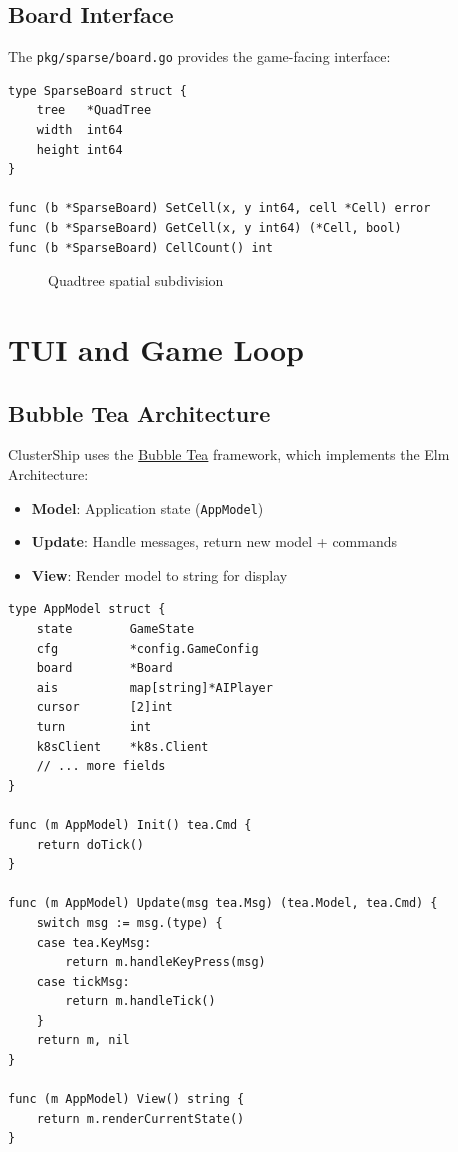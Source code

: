 \documentclass[11pt]{article}
\begin{document}
\subsection{Board Interface}

The \texttt{pkg/sparse/board.go} provides the game-facing interface:

\begin{lstlisting}
type SparseBoard struct {
    tree   *QuadTree
    width  int64
    height int64
}

func (b *SparseBoard) SetCell(x, y int64, cell *Cell) error
func (b *SparseBoard) GetCell(x, y int64) (*Cell, bool)
func (b *SparseBoard) CellCount() int
\end{lstlisting}

\begin{figure}[H]
    \centering
    \caption{Quadtree spatial subdivision}
    \label{fig:quadtree}
\end{figure}


\section{TUI and Game Loop}


\subsection{Bubble Tea Architecture}

ClusterShip uses the \href{https://github.com/charmbracelet/bubbletea}{Bubble Tea} framework, which implements the Elm Architecture:

\begin{itemize}
    \item \textbf{Model}: Application state (\texttt{AppModel})
    \item \textbf{Update}: Handle messages, return new model + commands
    \item \textbf{View}: Render model to string for display
\end{itemize}

\begin{lstlisting}
type AppModel struct {
    state        GameState
    cfg          *config.GameConfig
    board        *Board
    ais          map[string]*AIPlayer
    cursor       [2]int
    turn         int
    k8sClient    *k8s.Client
    // ... more fields
}

func (m AppModel) Init() tea.Cmd {
    return doTick()
}

func (m AppModel) Update(msg tea.Msg) (tea.Model, tea.Cmd) {
    switch msg := msg.(type) {
    case tea.KeyMsg:
        return m.handleKeyPress(msg)
    case tickMsg:
        return m.handleTick()
    }
    return m, nil
}

func (m AppModel) View() string {
    return m.renderCurrentState()
}
\end{lstlisting}
\end{document}
